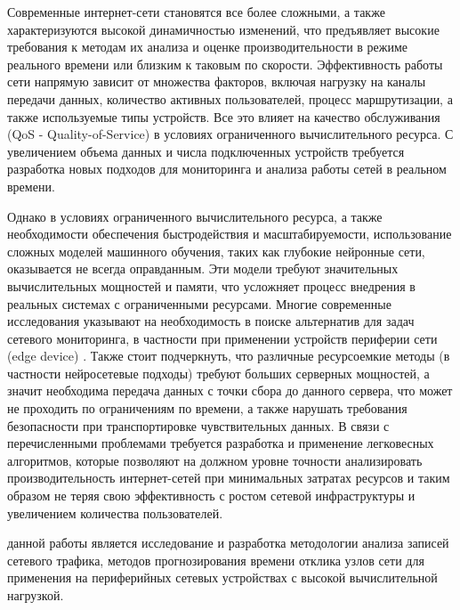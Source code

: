 
{\actuality} Современные интернет-сети становятся все более сложными, а также характеризуются высокой динамичностью изменений, что предъявляет высокие требования к методам их анализа и оценке производительности в режиме реального времени или близким к таковым по скорости. Эффективность работы сети напрямую зависит от множества факторов, включая нагрузку на каналы передачи данных, количество активных пользователей, процесс маршрутизации, а также используемые типы устройств. Все это влияет на качество обслуживания (QoS - Quality-of-Service) в условиях ограниченного вычислительного ресурса. С увеличением объема данных и числа подключенных устройств требуется разработка новых подходов для мониторинга и анализа работы сетей в реальном времени.

Однако в условиях ограниченного вычислительного ресурса, а также необходимости обеспечения быстродействия и масштабируемости, использование сложных моделей машинного обучения, таких как глубокие нейронные сети, оказывается не всегда оправданным. Эти модели требуют значительных вычислительных мощностей и памяти, что усложняет процесс внедрения в реальных системах с ограниченными ресурсами. Многие современные исследования указывают на необходимость в поиске альтернатив для задач сетевого мониторинга, в частности при применении устройств периферии сети (edge device) \cite{Xu2019LightweightNet, Wang2024Lightweight, Liu2022Analysis}. Также стоит подчеркнуть, что различные ресурсоемкие методы (в частности нейросетевые подходы) требуют больших серверных мощностей, а значит необходима передача данных с точки сбора до данного сервера, что может не проходить по ограничениям по времени, а также нарушать требования безопасности при транспортировке чувствительных данных. В связи с перечисленными проблемами требуется разработка и применение легковесных алгоритмов, которые позволяют на должном уровне точности анализировать производительность интернет-сетей при минимальных затратах ресурсов и таким образом не теряя свою эффективность с ростом сетевой инфраструктуры и увеличением количества пользователей.




{\aim} данной работы является исследование и разработка методологии анализа записей сетевого трафика, методов прогнозирования времени отклика узлов сети для применения на периферийных сетевых устройствах с высокой вычислительной нагрузкой.

